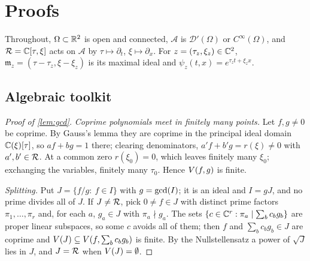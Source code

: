 \section{Proofs}\label{app:proofs}
Throughout, $\Omega\subset\mathbb{R}^2$ is open and connected, $\mathcal A$ is $\mathcal D'(\Omega)$ or $C^\infty(\Omega)$, and
$\mathcal{R}=\mathbb{C}[\tau,\xi]$ acts on $\mathcal A$ by $\tau\mapsto\partial_t$, $\xi\mapsto\partial_x$. For $z=(\tau_z,\xi_z)\in\mathbb{C}^2$,
$\mathfrak m_z=(\tau-\tau_z,\xi-\xi_z)$ is its maximal ideal and $\psi_z(t,x)=e^{\tau_zt+\xi_zx}$.

\subsection{Algebraic toolkit}
\begin{proof}[Proof of \cref{lem:gcd}]
\emph{Coprime polynomials meet in finitely many points.} Let $f,g\ne0$ be coprime. By Gauss's lemma they are
coprime in the principal ideal domain $\mathbb{C}(\xi)[\tau]$, so $af+bg=1$ there; clearing denominators,
$a'f+b'g=r(\xi)\ne0$ with $a',b'\in\mathcal{R}$. At a common zero $r(\xi_0)=0$, which leaves finitely many $\xi_0$;
exchanging the variables, finitely many $\tau_0$. Hence $V(f,g)$ is finite.

\emph{Splitting.} Put $J=\{f/g:\ f\in I\}$ with $g=\operatorname{gcd}(I)$; it is an ideal and $I=gJ$, and no prime divides all
of $J$. If $J\ne\mathcal{R}$, pick $0\ne f\in J$ with distinct prime factors $\pi_1,\dots,\pi_r$ and, for each $a$,
$g_a\in J$ with $\pi_a\nmid g_a$. The sets $\{c\in\mathbb{C}^r:\pi_a\mid\sum_bc_bg_b\}$ are proper linear subspaces, so some
$c$ avoids all of them; then $f$ and $\sum_bc_bg_b\in J$ are coprime and $V(J)\subseteq V(f,\sum_bc_bg_b)$ is
finite. By the Nullstellensatz a power of $\sqrt J$ lies in $J$, and $J=\mathcal{R}$ when $V(J)=\emptyset$.
\end{proof}

